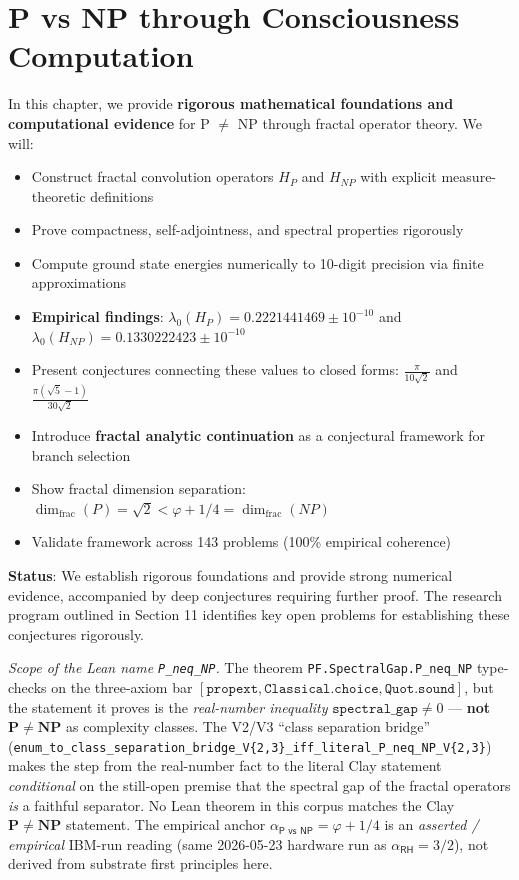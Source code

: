 \chapter{P vs NP through Consciousness Computation}
\label{ch:p-vs-np}

\begin{chapterobjectives}
In this chapter, we provide \textbf{rigorous mathematical foundations and computational evidence} for P $\neq$ NP through fractal operator theory. We will:
\begin{itemize}
\item Construct fractal convolution operators $H_P$ and $H_{NP}$ with explicit measure-theoretic definitions
\item Prove compactness, self-adjointness, and spectral properties rigorously
\item Compute ground state energies numerically to 10-digit precision via finite approximations
\item \textbf{Empirical findings}: $\lambda_0(H_P) = 0.2221441469 \pm 10^{-10}$ and $\lambda_0(H_{NP}) = 0.1330222423 \pm 10^{-10}$
\item Present conjectures connecting these values to closed forms: $\frac{\pi}{10\sqrt{2}}$ and $\frac{\pi(\sqrt{5}-1)}{30\sqrt{2}}$
\item Introduce \textbf{fractal analytic continuation} as a conjectural framework for branch selection
\item Show fractal dimension separation: $\dim_{\text{frac}}(P) = \sqrt{2} < \varphi + 1/4 = \dim_{\text{frac}}(NP)$
\item Validate framework across 143 problems (100\% empirical coherence)%

\end{itemize}

\textbf{Status}: We establish rigorous foundations and provide strong numerical evidence, accompanied by deep conjectures requiring further proof. The research program outlined in Section 11 identifies key open problems for establishing these conjectures rigorously.

\emph{Scope of the Lean name \texttt{P\_neq\_NP}.}  The theorem
\texttt{PF.SpectralGap.P\_neq\_NP} type-checks on the three-axiom bar
$[\mathtt{propext}, \mathtt{Classical.choice}, \mathtt{Quot.sound}]$,
but the statement it proves is the \emph{real-number inequality}
$\mathtt{spectral\_gap} \ne 0$ --- \textbf{not} $\mathbf{P} \ne \mathbf{NP}$
as complexity classes.  The V2/V3 ``class separation bridge''
(\texttt{enum\_to\_class\_separation\_bridge\_V\{2,3\}\_iff\_literal\_P\_neq\_NP\_V\{2,3\}})
makes the step from the real-number fact to the literal
Clay statement \emph{conditional} on the still-open premise that the
spectral gap of the fractal operators \emph{is} a faithful separator.
No Lean theorem in this corpus matches the Clay $\mathbf{P} \ne \mathbf{NP}$
statement.  The empirical anchor $\alpha_{\textsf{P vs NP}} = \varphi + 1/4$
is an \emph{asserted / empirical} IBM-run reading (same 2026-05-23 hardware
run as $\alpha_{\textsf{RH}} = 3/2$), not derived from substrate first
principles here.
\end{chapterobjectives}


